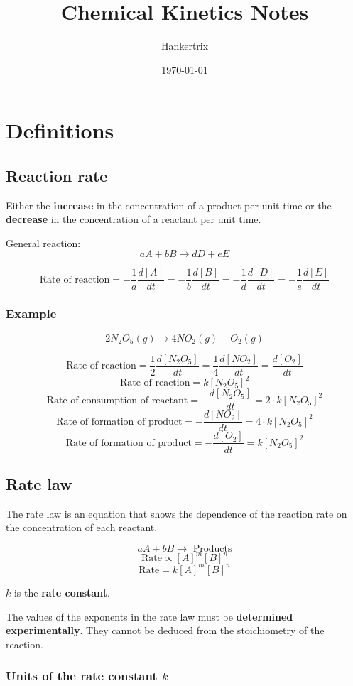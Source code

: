 \documentclass[11pt]{article}
\author{Hankertrix}
\date{\today}
\title{Chemical Kinetics Notes}
\begin{document}
\maketitle
\setcounter{tocdepth}{2}
\tableofcontents \clearpage\section{Definitions}
\label{sec:org4e0a55a}

\subsection{Reaction rate}
\label{sec:org0bf9e4c}
Either the \textbf{increase} in the concentration of a product per unit time or the \textbf{decrease} in the concentration of a reactant per unit time.


General reaction:
\[aA + bB \rightarrow dD + eE\]

\[\text{Rate of reaction} = - \frac{1}{a}\frac{d[A]}{dt} = - \frac{1}{b}\frac{d[B]}{dt} = - \frac{1}{d}\frac{d[D]}{dt} = - \frac{1}{e}\frac{d[E]}{dt}\]
\subsubsection{Example}
\label{sec:org55fae2a}

\[2N_2O_5 (g) \rightarrow 4 NO_2 (g) + O_2 (g)\]

\[\text{Rate of reaction} = \frac{1}{2}\frac{d[N_2O_5]}{dt} = \frac{1}{4}\frac{d[NO_2]}{dt} = \frac{d[O_2]}{dt}\]
\[\text{Rate of reaction} = k[N_2O_5]^2\]
\[\text{Rate of consumption of reactant} = -\frac{d[N_2O_5]}{dt} = 2 \cdot k[N_2O_5]^2\]
\[\text{Rate of formation of product} = -\frac{d[NO_2]}{dt} = 4 \cdot k[N_2O_5]^2\]
\[\text{Rate of formation of product} = -\frac{d[O_2]}{dt} = k[N_2O_5]^2\]
\subsection{Rate law}
\label{sec:orgaadccba}
The rate law is an equation that shows the dependence of the reaction rate on the concentration of each reactant.

\[aA + bB \rightarrow \text{ Products}\]
\[\text{Rate} \propto [A]^m[B]^n\]
\[\text{Rate} = k[A]^m[B]^n\]

\(k\) is the \textbf{rate constant}.


The values of the exponents in the rate law must be \textbf{determined experimentally}. They cannot be deduced from the stoichiometry of the reaction.
\subsubsection{Units of the rate constant \(k\)}
\label{sec:orgf3740cf}
\end{document}
